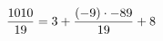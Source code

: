 \documentclass[preview]{standalone}
\begin{document}
\begin{align*}
\special{dvisvgm:raw <g id='unique000'>}\frac{1010}{19} = 3 + \frac{(-9) \cdot -89}{19} + 8\special{dvisvgm:raw </g>}
\end{align*}
\end{document}
